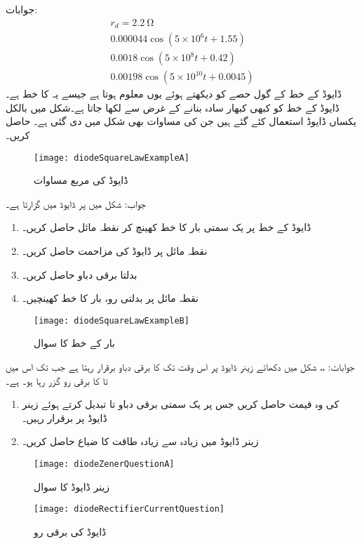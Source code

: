 جوابات:
\begin{align*}
r_d=\SI{2.2}{\ohm}\\
0.000044 \cos (5 \times 10^{6} t+1.55)\\
0.0018 \cos (5 \times 10^{8} t+0.42)\\
0.00198 \cos (5 \times 10^{10} t+0.0045)
\end{align*}
ڈایوڈ کے خط کے گول حصے کو دیکھتے ہوئے یوں معلوم ہوتا ہے جیسے یہ  کا خط ہے۔ڈایوڈ کے خط کو کبھی کبھار سادہ بنانے کے غرض سے  لکھا جاتا ہے۔شکل  میں بالکل یکساں ڈایوڈ استعمال کئے گئے ہیں جن کی مساوات بھی شکل میں دی گئی ہے۔ حاصل کریں۔ 
\begin{figure}
\centering
\texttt{[image: diodeSquareLawExampleA]}
\caption{ڈایوڈ کی مربع مساوات}
\label{شکل_ڈایوڈ_مربع_مساوات}
\end{figure}

جواب: 
شکل  میں  پر ڈایوڈ میں  گزارتا ہے۔
\begin{enumerate}
\item
ڈایوڈ کے خط پر یک سمتی بار کا خط کھینچ کر نقطہ مائل حاصل کریں۔
\item
نقطہ مائل پر ڈایوڈ کی مزاحمت  حاصل کریں۔
\item
بدلتا برقی دباو  حاصل کریں۔
\item
نقطہ مائل پر بدلتی رو، بار کا خط کھینچیں۔
\end{enumerate}
\begin{figure}
\centering
\texttt{[image: diodeSquareLawExampleB]}
\caption{بار کے خط کا سوال}
\label{شکل_ڈایوڈ_بار_کے_خط}
\end{figure}

جوابات: ،،  
شکل  میں دکھائے زینر ڈایوڈ پر اس وقت تک  کا برقی دباو برقرار رہتا ہے  جب تک اس میں  تا  کا برقی رو گزر رہا ہو۔ ہے۔
\begin{enumerate}
\item
{} کی وہ قیمت حاصل کریں جس پر یک سمتی برقی دباو  تا  تبدیل کرتے ہوئے  زینر ڈایوڈ پر  برقرار رہیں۔
\item
زینر ڈایوڈ میں زیادہ سے زیادہ طاقت کا ضیاع حاصل کریں۔
\end{enumerate}
%
\begin{figure}
\centering
\texttt{[image: diodeZenerQuestionA]}
\caption{زینر ڈایوڈ کا سوال}
\label{شکل_زینر_ڈایوڈ_سوال_الف}
\end{figure}
%
\begin{figure}
\centering
\texttt{[image: diodeRectifierCurrentQuestion]}
\caption{ڈایوڈ کی برقی رو}
\label{شکل_ڈایوڈ_برقی_رو}
\end{figure}

